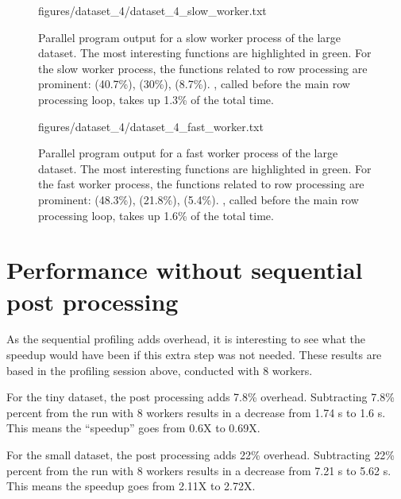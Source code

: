 \begin{figure}[ht]
  \begin{VerbatimInput}{figures/dataset_4/dataset_4_slow_worker.txt}
    \caption[Parallel program  output for a slow worker process of the large dataset.]{Parallel program  output for a slow worker process of the large dataset.
    The most interesting functions are highlighted in green.
For the slow worker process, the functions related to row processing are prominent:  (40.7\%),  (30\%), 
(8.7\%). , called before the main row processing loop, takes up 1.3\% of the total time.}
  \label{fig:profiler_large_slow_worker}
\end{VerbatimInput}
\end{figure}

\begin{figure}[ht]
  \begin{VerbatimInput}{figures/dataset_4/dataset_4_fast_worker.txt}
    \caption[Parallel program  output for a fast worker process of the large dataset.]{Parallel program  output for a fast worker process of the large dataset.
    The most interesting functions are highlighted in green.
For the fast worker process, the functions related to row processing are prominent:  (48.3\%),  (21.8\%), 
(5.4\%). , called before the main row processing loop, takes up 1.6\% of the total time.}
  \label{fig:profiler_large_fast_worker}
\end{VerbatimInput}
\end{figure}

\FloatBarrier
\section{Performance without sequential post processing}
As the sequential profiling adds overhead, it is interesting to see what the speedup would have been if this extra step was not needed.
These results are based in the profiling session above, conducted with 8 workers.

For the tiny dataset, the post processing adds 7.8\% overhead. Subtracting 7.8\% percent from the run with 8 workers results in a decrease
from 1.74 s to 1.6 s. This means the ``speedup'' goes from 0.6X to 0.69X.

For the small dataset, the post processing adds 22\% overhead. Subtracting 22\% percent from the run with 8 workers results in a decrease
from 7.21 s to 5.62 s. This means the speedup goes from 2.11X to 2.72X.

